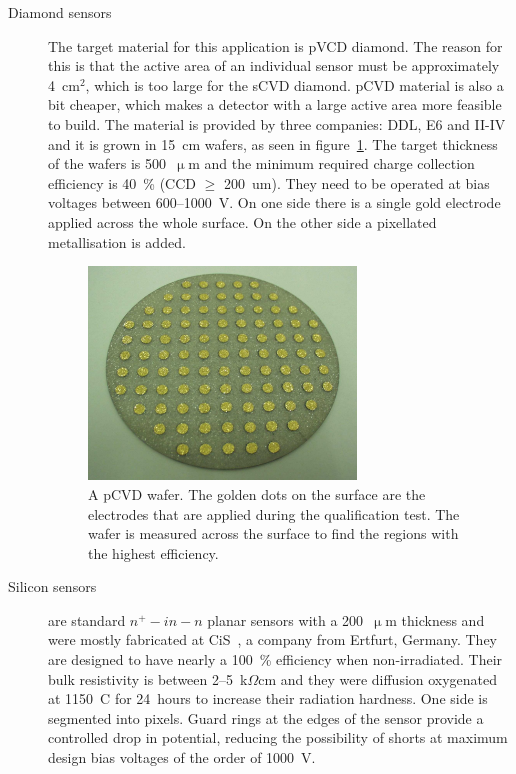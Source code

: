  
\begin{description}
\item[Diamond sensors] The target material for this application is pVCD diamond. The reason for this is that the active area of an individual sensor must be approximately 4~cm$^2$, which is too large for the sCVD diamond. pCVD material is also a bit cheaper, which makes a detector with a large active area more feasible to build. The material is provided by three companies: DDL, E6 and II-IV and it is grown in 15~cm wafers, as seen in figure~\ref{fig:wafer}. The target thickness of the wafers is 500~$\upmu$m and the minimum required charge collection efficiency is 40~\% (CCD $\geq$ 200~um). They need to be operated at bias voltages between 600--1000~V. On one side there is a single gold electrode applied across the whole surface. On the other side a pixellated metallisation is added. 
\begin{figure}[!t]
\centering
\includegraphics[width=0.7\textwidth]{04_charge_monitoring/pics/wafer}
\caption{A pCVD wafer. The golden dots on the surface are the electrodes that are applied during the qualification test. The wafer is measured across the surface to find the regions with the highest efficiency.}
\label{fig:wafer}
\end{figure}
\item[Silicon sensors] are standard $n^+ - in - n$ planar sensors with a 200~$\upmu$m thickness and were mostly fabricated at CiS~\cite{}, a company from Ertfurt, Germany. They are designed to have nearly a 100~\% efficiency when non-irradiated. Their bulk resistivity is between 2--5~k$\Omega$cm and they were diffusion oxygenated at 1150~\textdegree C for 24~hours to increase their radiation hardness. One side is segmented into pixels. Guard rings at the edges of the sensor provide a controlled drop in potential, reducing the possibility of shorts at maximum design bias voltages of the order of 1000~V.
\end{description}




